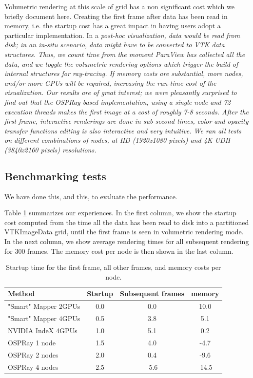 \documentclass[final,5p,times,twocolumn]{elsarticle}
\begin{document}
Volumetric rendering at this scale of grid has a non significant cost which we
briefly document here. Creating the first frame after data has been read in memory,
 i.e. the startup cost has a great impact in having users adopt a particular implementation.
In a \it{post-hoc} \rm visualization, data would be read from disk; in an \it{in-situ} \rm
scenario, data might have to be converted to VTK data structures. Thus, we count time
from the moment ParaView has collected all the data, and we toggle the volumetric
rendering options which trigger the build of internal structures for ray-tracing.
If memory costs are substantial, more nodes, and/or more GPUs will be required, increasing the
run-time cost of the visualization. Our results are of great interest; we were
pleasantly surprised to find out that the OSPRay based implementation, using a
single node and 72 execution threads makes the first image at a cost of roughly 7-8 seconds. 
After the first frame, interactive renderings are done in sub-second times,
color and opacity transfer functions editing is also interactive and very intuitive.
 We ran all tests on different combinations of nodes, at HD (1920x1080 pixels) and
4K UDH (3840x2160 pixels) resolutions.

\subsection{Benchmarking tests}

We have done this, and this, to evaluate the performance.



Table \ref{tab:example-tab} summarizes our experiences. In the first column, we
show the startup cost computed from the time all the data has been read to disk
into a partitioned VTKImageData grid, until the first frame is seen in volumetric
rendering mode. In the next column, we show average rendering times for all subsequent
rendering for 300 frames. The memory cost per node is then shown in the last column.

\begin{table}[htb]
  \centering
  \caption{
    Startup time for the first frame, all other frames, and memory costs per node.
  }
  \label{tab:example-tab}

  \begin{tabular}{lccc}
    \hline
    Method & Startup & Subsequent frames & memory \\
    \hline
    "Smart" Mapper 2GPUs & 0.0 &  0.0 &  10.0 \\
    "Smart" Mapper 4GPUs & 0.5 &  3.8 &  5.1 \\
    NVIDIA IndeX 4GPUs & 1.0 &  5.1 & 0.2 \\
    OSPRay 1 node & 1.5 &  4.0 &  -4.7 \\
    OSPRay 2 nodes & 2.0 &  0.4 &  -9.6 \\
    OSPRay 4 nodes & 2.5 & -5.6 & -14.5 \\
    \hline

  \end{tabular}
\end{table}
\end{document}
